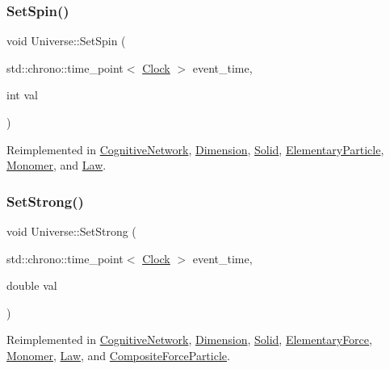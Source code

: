 \subsubsection{\texorpdfstring{Set\+Spin()}{SetSpin()}}
{\footnotesize\ttfamily void Universe\+::\+Set\+Spin (\begin{DoxyParamCaption}\item[{std\+::chrono\+::time\+\_\+point$<$ \mbox{\hyperlink{universe_8h_a0ef8d951d1ca5ab3cfaf7ab4c7a6fd80}{Clock}} $>$}]{event\+\_\+time,  }\item[{int}]{val }\end{DoxyParamCaption})\hspace{0.3cm}{\ttfamily [virtual]}}



Reimplemented in \mbox{\hyperlink{classCognitiveNetwork_a3fc6d08413bfd4350f94d6f2627eedc7}{Cognitive\+Network}}, \mbox{\hyperlink{classDimension_a8d73c050c67b0226572b4a1b08ae6594}{Dimension}}, \mbox{\hyperlink{classSolid_a615cb8d1ec1376781726bcefa86339cb}{Solid}}, \mbox{\hyperlink{classElementaryParticle_a437fa86d88157314b84662b158d52353}{Elementary\+Particle}}, \mbox{\hyperlink{classMonomer_ad24a86a4c1ac62d1b0ce8040d6b08adf}{Monomer}}, and \mbox{\hyperlink{classLaw_a3de75edea5e20db0a7b731de61f07dea}{Law}}.

\mbox{\label{classUniverse_a5946c8f3d4cda305f3ecd10df21a2f94}} 
\subsubsection{\texorpdfstring{Set\+Strong()}{SetStrong()}}
{\footnotesize\ttfamily void Universe\+::\+Set\+Strong (\begin{DoxyParamCaption}\item[{std\+::chrono\+::time\+\_\+point$<$ \mbox{\hyperlink{universe_8h_a0ef8d951d1ca5ab3cfaf7ab4c7a6fd80}{Clock}} $>$}]{event\+\_\+time,  }\item[{double}]{val }\end{DoxyParamCaption})\hspace{0.3cm}{\ttfamily [virtual]}}



Reimplemented in \mbox{\hyperlink{classCognitiveNetwork_a50f2a12c9873e623d6247318b041ba30}{Cognitive\+Network}}, \mbox{\hyperlink{classDimension_ab9021cb6727ed590026bf870c638576d}{Dimension}}, \mbox{\hyperlink{classSolid_a478e15cdf15c5bb01cbcbd5f584ef83a}{Solid}}, \mbox{\hyperlink{classElementaryForce_aa1b5708cfab2069049fec5c924e1f246}{Elementary\+Force}}, \mbox{\hyperlink{classMonomer_a10b864f6bcad43f11a2316dbbe4c4742}{Monomer}}, \mbox{\hyperlink{classLaw_a4cd0dd1908edbd02090dd1ba1387d722}{Law}}, and \mbox{\hyperlink{classCompositeForceParticle_a06488ef0457335648b161d3ed746b643}{Composite\+Force\+Particle}}.

